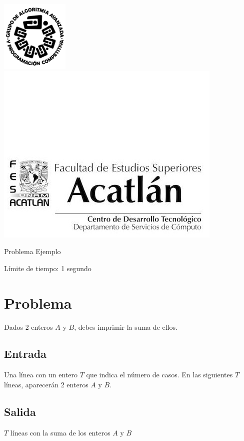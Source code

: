 \includegraphics[scale=0.6]{logo} \hspace*{9.00cm}
\includegraphics[scale=0.5]{dsc} 
\bigskip
\begin{center}
	\Large Problema Ejemplo
\end{center}

\begin{flushright}
Límite de tiempo: 1 segundo
\par\end{flushright}
\bigskip

\section*{Problema}

Dados 2 enteros $A$ y $B$, debes imprimir la suma de ellos.

\subsection*{Entrada}

Una línea con un entero $T$ que indica el número de casos.
En las siguientes $T$ líneas, aparecerán 2 enteros $A$ y $B$.

\subsection*{Salida}
$T$ líneas con la suma de los enteros $A$ y $B$


